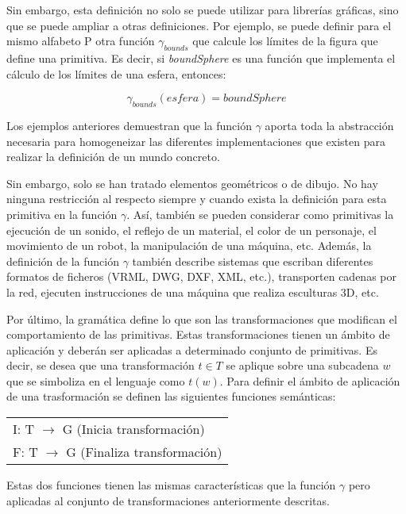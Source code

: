 \documentclass{egpubl}
\begin{document}
Sin embargo, esta definici\'on no solo se puede utilizar para
librer\'ias gr\'aficas, sino que se puede ampliar a otras definiciones.
Por ejemplo, se puede definir para el mismo alfabeto P otra funci\'on
$\gamma_{bounds}$ que calcule los l\'imites de la figura
que define una primitiva. Es decir, si
{\textquotesingle}\textit{boundSphere}{\textquotesingle} es una
funci\'on que implementa el c\'alculo de los l\'imites de una esfera,
entonces:

\[ \gamma_{bounds}(esfera) = boundSphere \]



Los ejemplos anteriores demuestran que la funci\'on $\gamma$ aporta
toda la abstracci\'on necesaria para homogeneizar las diferentes
implementaciones que existen para realizar la definici\'on de un mundo
concreto.


Sin embargo, solo se han tratado elementos geom\'etricos o de dibujo.
No hay ninguna restricci\'on al respecto siempre y cuando exista la
definici\'on para esta primitiva en la funci\'on $\gamma$. As\'i,
tambi\'en se pueden considerar como primitivas la ejecuci\'on de un
sonido, el reflejo de un material, el color de un personaje, el
movimiento de un robot, la manipulaci\'on de una m\'aquina, etc.
Adem\'as, la definici\'on de la funci\'on $\gamma$ tambi\'en describe
sistemas que escriban diferentes formatos de ficheros (VRML, DWG, DXF,
XML, etc.), transporten cadenas por la red, ejecuten instrucciones de
una m\'aquina que realiza esculturas 3D, etc.


Por \'ultimo, la gram\'atica define lo que son las transformaciones que
modifican el comportamiento de las primitivas. Estas transformaciones
tienen un \'ambito de aplicaci\'on y deber\'an ser aplicadas a
determinado conjunto de primitivas. Es decir, se desea que una
transformaci\'on $t \in T$ se aplique sobre una subcadena $w$ que se
simboliza en el lenguaje como $t(w)$. Para definir el \'ambito de
aplicaci\'on de una trasformaci\'on se definen las siguientes funciones
sem\'anticas:

\begin{center}
\begin{tabular}{l}
	I: T ${\rightarrow}$ G (Inicia transformaci\'on) \\

	F: T ${\rightarrow}$ G (Finaliza transformaci\'on)
\end{tabular}
\end{center}


Estas dos funciones tienen las mismas caracter\'isticas que la
funci\'on $\gamma$ pero aplicadas al conjunto de transformaciones
anteriormente descritas.
\end{document}
